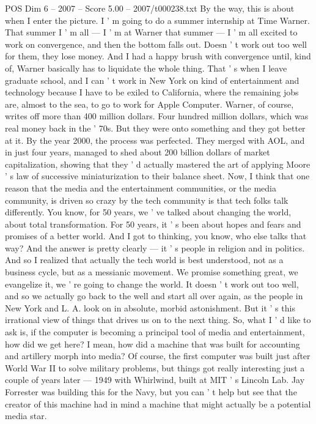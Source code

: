 \begin{textsample}{POS Dim 6 – 2007 – Score 5.00 – 2007/t000238.txt}
By the way, this is about when I enter the picture.
I ' m going to do a summer internship at Time Warner.
That summer I ' m all — I ' m at Warner that summer — I ' m all excited to work on convergence, and then the bottom falls out.
Doesn ' t work out too well for them, they lose money.
And I had a happy brush with convergence until, kind of, Warner basically has to liquidate the whole thing.
That ' s when I leave graduate school, and I can ' t work in New York on kind of entertainment and technology because I have to be exiled to California, where the remaining jobs are, almost to the sea, to go to work for Apple Computer.
Warner, of course, writes off more than 400 million dollars.
Four hundred million dollars, which was real money back in the ' 70s.
But they were onto something and they got better at it.
By the year 2000, the process was perfected.
They merged with AOL, and in just four years, managed to shed about 200 billion dollars of market capitalization, showing that they ' d actually mastered the art of applying Moore ' s law of successive miniaturization to their balance sheet.
Now, I think that one reason that the media and the entertainment communities, or the media community, is driven so crazy by the tech community is that tech folks talk differently.
You know, for 50 years, we ' ve talked about changing the world, about total transformation.
For 50 years, it ' s been about hopes and fears and promises of a better world.
And I got to thinking, you know, who else talks that way?
And the answer is pretty clearly — it ' s people in religion and in politics.
And so I realized that actually the tech world is best understood, not as a business cycle, but as a messianic movement.
We promise something great, we evangelize it, we ' re going to change the world.
It doesn ' t work out too well, and so we actually go back to the well and start all over again, as the people in New York and L.
A. look on in absolute, morbid astonishment.
But it ' s this irrational view of things that drives us on to the next thing.
So, what I ' d like to ask is, if the computer is becoming a principal tool of media and entertainment, how did we get here?
I mean, how did a machine that was built for accounting and artillery morph into media?
Of course, the first computer was built just after World War II to solve military problems, but things got really interesting just a couple of years later — 1949 with Whirlwind, built at MIT ' s Lincoln Lab.
Jay Forrester was building this for the Navy, but you can ' t help but see that the creator of this machine had in mind a machine that might actually be a potential media star.

\end{textsample}
